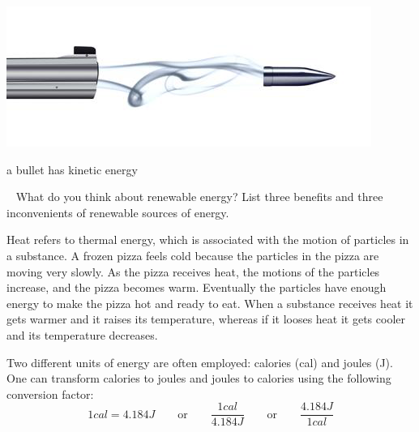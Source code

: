 \documentclass[main.tex]{subfiles}
\begin{document}
\begin{description}
\begin{marginfigure}
      \includegraphics{chapter2/figure1-2}
      \caption{a bullet has kinetic energy}
      \label{fig:marginfig}
   \end{marginfigure}
     \begin{marginfigure}
\begin{tcolorbox}[enhanced,colback=red!5!white,colframe=black!50!red,boxrule=1pt,
  arc=0pt,outer arc=0pt,drop heavy lifted shadow]
\faGears\ 
 What do you think about renewable energy? List three benefits and three inconvenients of renewable sources of energy. \end{tcolorbox}
 \end{marginfigure}
\item[\docfilehook{Heat}{Heat}] Heat refers to thermal energy, which is associated with the motion of particles in a substance. A frozen pizza feels cold because the particles in the pizza are moving very slowly. As the pizza receives heat, the motions of the particles increase, and the pizza becomes warm. Eventually the particles have enough energy to make the pizza hot and ready to eat. When a substance receives heat it gets warmer and it raises its temperature, whereas if it looses heat it gets cooler and its temperature decreases. 

   
\item[\docfilehook{Energy units}{Energy units}] Two different units of energy are often employed: calories (cal) and joules (J). One can transform calories to joules and joules to calories using the following conversion factor: 
\begin{equation}
\boxed{    1 cal=4.184 J   } \qquad\text{or}\qquad  \boxed{\frac{1cal}{4.184 J}}\qquad\text{or}\qquad  \boxed{\frac{4.184 J}{1 cal}}
\label{formula2:1}
\end{equation}




\end{description}
\end{document}

